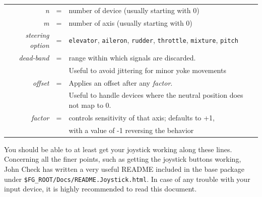{\begin{tabular}{rcl}
 \textit{n} &=& number of device (usually starting with 0)\\
 \textit{m} &=& number of axis (usually starting with 0)\\
 \textit{steering option} &=& \texttt{elevator}, \texttt{aileron}, \texttt{rudder},
 \texttt{throttle}, \texttt{mixture}, \texttt{pitch}\\
 \textit{dead-band} &=& range within which signals are discarded.\\
                   && Useful to avoid jittering for minor yoke movements\\
 \textit{offset} &=& Applies an offset after any \textit{factor}. \\
                   && Useful to handle devices where the neutral position does not map to 0.\\
  \textit{factor} &=& controls sensitivity of that axis; defaults to +1,\\
                 &&with a value of -1 reversing the behavior
  \end{tabular}
 \medskip

You should be able to at least get your joystick working along
these lines. Concerning all the finer points, such as getting the joystick buttons
working, John Check has written a very useful README  included in the base package under \texttt{\$FG\_ROOT/Docs/README.Joystick.html}. In case of any trouble with your input device, it is highly recommended to read this document.

}

